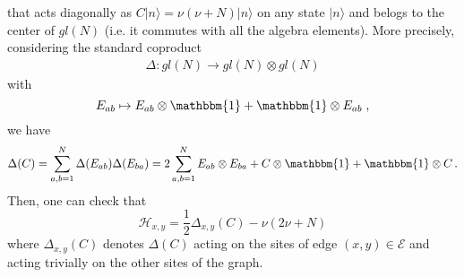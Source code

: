 \documentclass[10pt]{article}
\numberwithin{equation}{section}
\numberwithin{equation}{subsection}
\newcommand{\co}{\;,}
\newcommand{\twoj}{\nu}
\begin{document}
that acts diagonally as $C|{n}\rangle=\twoj(\twoj+N)|{n}\rangle$ on any state $|n\rangle$ and belogs to the center of ${gl}(N)$ (i.e. it commutes with all the algebra elements).  
More precisely,  considering the standard coproduct 
\begin{equation}
\begin{split}
\Delta:{gl}(N)\to {gl}(N)\otimes {gl}(N)
\end{split}
\end{equation}
with
\begin{equation}
E_{ab}\mapsto E_{ab}\otimes \mathbbm{1}+\mathbbm{1}\otimes E_{ab}\co
\end{equation} 
we have 
\begin{equation}
\Delta(C)=\sum_{a,b=1}^{N}\Delta(E_{ab})\Delta(E_{ba})=2\sum_{a,b=1}^{N}E_{ab}\otimes E_{ba}+C\otimes \mathbbm{1}+\mathbbm{1}\otimes C\,.
\end{equation}
Then, one can check that 
\begin{equation}\label{hamiltonianCasimir}
	\mathcal{H}_{x,y}=\frac{1}{2}\Delta_{x,y}(C)-\twoj(2\twoj+N)
\end{equation}
where $\Delta_{x,y}(C)$ denotes  $\Delta(C)$ acting on  the sites of edge $(x,y)\in \mathcal{E}$ and acting trivially on the other sites of the graph.



 
\end{document}

